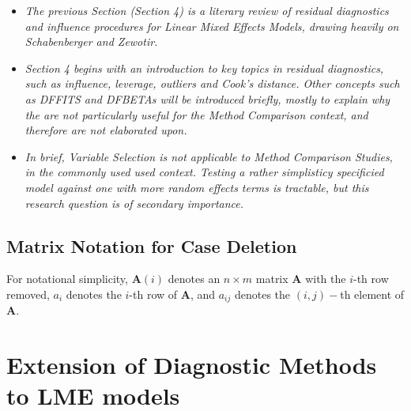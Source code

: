 \documentclass[12pt, a4paper]{report}
\theoremstyle{plain}
\theoremstyle{definition}
\theoremstyle{remark}
\begin{document}
\begin{itemize}
	\item \textit{
		The previous Section (Section 4) is a literary review of residual diagnostics and influence procedures
		for Linear Mixed Effects Models, drawing heavily on Schabenberger and Zewotir.}
	
	\item \textit{	Section 4 begins with an introduction to key topics in residual diagnostics, such as influence, leverage, outliers
		and Cook's distance. Other concepts such as DFFITS and DFBETAs will be introduced briefly, mostly to explain why the are not particularly useful for
		the Method Comparison context, and therefore are not elaborated upon.}
	
	\item \textit{	In brief, Variable Selection is not applicable to Method Comparison Studies, in the 
		commonly used used context. 
		Testing a rather simplisticy specificied model against one with more random effects terms is tractable, but this research question is of secondary importance.}
\end{itemize}



\subsection{Matrix Notation for Case Deletion} %


For notational simplicity, $\boldsymbol{A}(i)$ denotes an $n \times m$ matrix $\boldsymbol{A}$ with the $i$-th row
removed, $a_i$ denotes the $i$-th row of $\boldsymbol{A}$, and $a_{ij}$ denotes the $(i, j)-$th element of $\boldsymbol{A}$.
%












\section{Extension of Diagnostic Methods to LME models}
\end{document}
